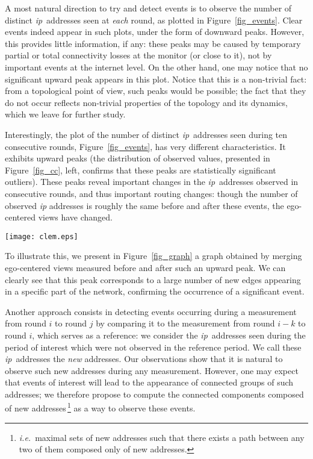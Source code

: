 \documentclass[times, 10pt,twocolumn]{article}
\newcommand{\ie}{{\em i.e.}}
\newcommand{\ip}{\mbox{\em \sc ip}}
\begin{document}
A most natural direction to try and detect events is to observe the
number of distinct \ip\ addresses seen at {\em each} round, as plotted
in Figure~\ref{fig_events}. Clear events indeed appear in such plots,
under the form of downward peaks.
However, this provides little
information, if any: these peaks may be caused by temporary partial or total 
connectivity losses at the monitor (or close to it), not by important
events at the internet level. On the other hand, one may notice that
no significant upward peak appears in this plot. Notice that this is a
non-trivial fact: from a topological point of view, such peaks would
be possible; the fact that they do not occur reflects non-trivial
properties of the topology and its dynamics, which we leave for
further study.

Interestingly, the plot of the number of distinct \ip\ addresses seen
during ten consecutive rounds, Figure~\ref{fig_events}, has very
different characteristics. It exhibits
upward peaks (the distribution of observed values,  presented
in Figure~\ref{fig_cc}, left, confirms that these peaks are statistically significant
outliers). These peaks reveal important changes in the \ip\ addresses
observed in consecutive rounds, and thus important routing changes:
though the number of observed \ip{} addresses is roughly the same before
and after these events,
the ego-centered views have changed.

\begin{figure*}[!ht]
\begin{center}
\texttt{[image: clem.eps]}
\end{center}
\caption{Representation of the event at round 106231 in Figure~\ref{fig_events}:
the graph is obtained by merging 100 rounds before the event together with 
a single round after the event.
Edges in bold black are edges that were seen in the round after the event but not in the 
100 rounds before.
}
\label{fig_graph}
\end{figure*}

To illustrate this,
we present in Figure~\ref{fig_graph} a graph obtained by merging ego-centered
views measured before and after such an upward peak.
We can clearly see that this peak corresponds to a large number of new edges 
appearing in a specific part of the network,
confirming the occurrence of a significant event.


\medskip
Another approach consists in detecting
events occurring during a measurement from round $i$ to round $j$ by
comparing it to the measurement from round $i-k$ to round $i$, which
serves as a reference: we consider the \ip\ addresses seen during the
period of interest which were not observed in the reference period. We
call these \ip\ addresses the {\em new} addresses. 
Our observations show that it is natural to observe such new addresses
during any measurement.
However, one may expect
that events of interest will lead to the appearance of connected
groups of such addresses; we therefore propose to compute the
connected components composed of new addresses\,\footnote{\ie\ maximal
  sets of new addresses such that there exists a path between any two
  of them composed only of new addresses.} as a way to observe these
events.
\end{document}
